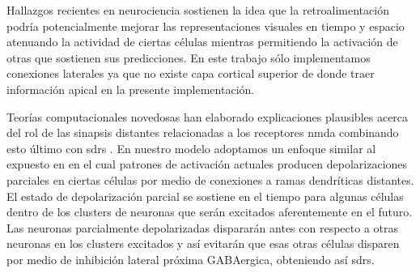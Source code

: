 
Hallazgos recientes en neurociencia \cite{Marques2018} sostienen la idea que la retroalimentación podría potencialmente mejorar las representaciones visuales en tiempo y espacio atenuando la actividad de ciertas células mientras permitiendo la activación de otras que sostienen sus predicciones. En este trabajo sólo implementamos conexiones laterales ya que no existe capa cortical superior de donde traer información apical en la presente implementación. 


Teorías computacionales novedosas han elaborado explicaciones plausibles acerca del rol de las sinapsis distantes relacionadas a los receptores \gls{nmda} \cite{hawkins_2016} combinando esto último con \glspl{sdr} \cite{ahmad_2016}. En nuestro modelo adoptamos un enfoque similar al expuesto en \cite{hawkins_2016} en el cual patrones de activación actuales producen depolarizaciones parciales en ciertas células por medio de conexiones a ramas dendríticas distantes. El estado de depolarización parcial se sostiene en el tiempo para algunas células dentro de los clusters de neuronas que serán excitados aferentemente en el futuro. Las neuronas parcialmente depolarizadas dispararán antes con respecto a otras neuronas en los clusters excitados y así evitarán que esas otras células disparen por medio de inhibición lateral próxima GABAergica, obteniendo así \glspl{sdr}. 

